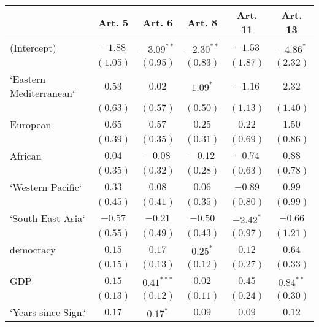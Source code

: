 
\begin{table}[!h]
\begin{center}
\begin{tabular}{l c c c c c }
\toprule
 & Art. 5 & Art. 6 & Art. 8 & Art. 11 & Art. 13 \\
\midrule
(Intercept)             & $-1.88$      & $-3.09^{**}$ & $-2.30^{**}$ & $-1.53$      & $-4.86^{*}$  \\
                        & $(1.05)$     & $(0.95)$     & $(0.83)$     & $(1.87)$     & $(2.32)$     \\
`Eastern Mediterranean` & $0.53$       & $0.02$       & $1.09^{*}$   & $-1.16$      & $2.32$       \\
                        & $(0.63)$     & $(0.57)$     & $(0.50)$     & $(1.13)$     & $(1.40)$     \\
European                & $0.65$       & $0.57$       & $0.25$       & $0.22$       & $1.50$       \\
                        & $(0.39)$     & $(0.35)$     & $(0.31)$     & $(0.69)$     & $(0.86)$     \\
African                 & $0.04$       & $-0.08$      & $-0.12$      & $-0.74$      & $0.88$       \\
                        & $(0.35)$     & $(0.32)$     & $(0.28)$     & $(0.63)$     & $(0.78)$     \\
`Western Pacific`       & $0.33$       & $0.08$       & $0.06$       & $-0.89$      & $0.99$       \\
                        & $(0.45)$     & $(0.41)$     & $(0.35)$     & $(0.80)$     & $(0.99)$     \\
`South-East Asia`       & $-0.57$      & $-0.21$      & $-0.50$      & $-2.42^{*}$  & $-0.66$      \\
                        & $(0.55)$     & $(0.49)$     & $(0.43)$     & $(0.97)$     & $(1.21)$     \\
democracy               & $0.15$       & $0.17$       & $0.25^{*}$   & $0.12$       & $0.64$       \\
                        & $(0.15)$     & $(0.13)$     & $(0.12)$     & $(0.27)$     & $(0.33)$     \\
GDP                     & $0.15$       & $0.41^{***}$ & $0.02$       & $0.45$       & $0.84^{**}$  \\
                        & $(0.13)$     & $(0.12)$     & $(0.11)$     & $(0.24)$     & $(0.30)$     \\
`Years since Sign.`     & $0.17$       & $0.17^{*}$   & $0.09$       & $0.09$       & $0.12$       \\

\end{tabular}
\end{center}
\end{table}
